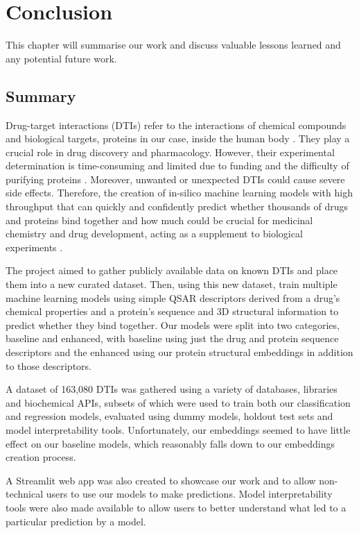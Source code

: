 \section{Conclusion}

This chapter will summarise our work and discuss valuable lessons learned and any potential future work.

\subsection{Summary}

Drug-target interactions (DTIs) refer to the interactions of chemical compounds and biological targets, proteins in our case, inside the human body \citep{Sachdev2019}. They play a crucial role in drug discovery and pharmacology. However, their experimental determination is time-consuming and limited due to funding and the difficulty of purifying proteins \citep{Shar2016, Wang2020}. Moreover, unwanted or unexpected DTIs could cause severe side effects. Therefore, the creation of in-silico machine learning models with high throughput that can quickly and confidently predict whether thousands of drugs and proteins bind together and how much could be crucial for medicinal chemistry and drug development, acting as a supplement to biological experiments \citep{Shar2016, Wang2020}.

The project aimed to gather publicly available data on known DTIs and place them into a new curated dataset. Then, using this new dataset, train multiple machine learning models using simple QSAR descriptors derived from a drug's chemical properties and a protein's sequence and 3D structural information to predict whether they bind together. Our models were split into two categories, baseline and enhanced, with baseline using just the drug and protein sequence descriptors and the enhanced using our protein structural embeddings in addition to those descriptors.

A dataset of 163,080 DTIs was gathered using a variety of databases, libraries and biochemical APIs, subsets of which were used to train both our classification and regression models, evaluated using dummy models, holdout test sets and model interpretability tools. Unfortunately, our embeddings seemed to have little effect on our baseline models, which reasonably falls down to our embeddings creation process.

A Streamlit web app was also created to showcase our work and to allow non-technical users to use our models to make predictions. Model interpretability tools were also made available to allow users to better understand what led to a particular prediction by a model.

